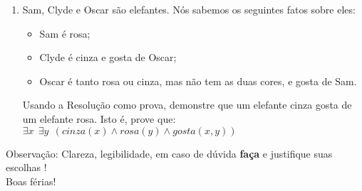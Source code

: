 \documentclass[10pt, a4paper,final]{article}
\begin{document}
\begin{enumerate}
\item Sam, Clyde e Oscar são elefantes. N\'os sabemos os seguintes 
fatos sobre eles:
\begin{itemize}
\setlength{\itemsep}{-2pt}
    \item Sam é rosa;
    \item Clyde é cinza e gosta de Oscar;
    \item Oscar é tanto rosa ou cinza, mas não tem as duas cores, e gosta de Sam.
\end{itemize}
Usando a Resolução como prova, demonstre que um elefante cinza gosta de um elefante rosa.
Isto é, prove que: $\exists x \:\: \exists y \:\:(cinza(x) \wedge rosa(y) \wedge gosta(x,y))$




\end{enumerate}

\vskip 2cm
\noindent Observação: Clareza,  legibilidade, em caso de dúvida {\bf faça} e
justifique suas escolhas !\\
\noindent Boas férias!

\end{document}
